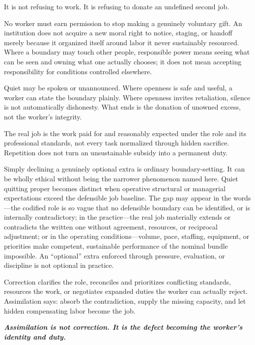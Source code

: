 \documentclass[11pt,oneside]{article}
\renewenvironment{quote}
  {\begin{tcolorbox}[
      enhanced,
      breakable,
      colback=ManifestLight,
      colframe=ManifestRule,
      boxrule=0pt,
      leftrule=3pt,
      arc=0pt,
      outer arc=0pt,
      left=10pt,right=10pt,top=8pt,bottom=8pt,
      before skip=0.8em,after skip=0.8em
    ]\itshape}
  {\end{tcolorbox}}
\begin{document}
It is not refusing to work. It is refusing to donate an undefined second
job.

No worker must earn permission to stop making a genuinely voluntary
gift. An institution does not acquire a new moral right to notice,
staging, or handoff merely because it organized itself around labor it
never sustainably resourced. Where a boundary may touch other people,
responsible power means seeing what can be seen and owning what one
actually chooses; it does not mean accepting responsibility for
conditions controlled elsewhere.

Quiet may be spoken or unannounced. Where openness is safe and useful, a
worker can state the boundary plainly. Where openness invites
retaliation, silence is not automatically dishonesty. What ends is the
donation of unowned excess, not the worker's integrity.

The real job is the work paid for and reasonably expected under the role
and its professional standards, not every task normalized through hidden
sacrifice. Repetition does not turn an unsustainable subsidy into a
permanent duty.

Simply declining a genuinely optional extra is ordinary
boundary-setting. It can be wholly ethical without being the narrower
phenomenon named here. Quiet quitting proper becomes distinct when
operative structural or managerial expectations exceed the defensible
job baseline. The gap may appear in the words---the codified role is so
vague that no defensible boundary can be identified, or is internally
contradictory; in the practice---the real job materially extends or
contradicts the written one without agreement, resources, or reciprocal
adjustment; or in the operating conditions---volume, pace, staffing,
equipment, or priorities make competent, sustainable performance of the
nominal bundle impossible. An ``optional'' extra enforced through
pressure, evaluation, or discipline is not optional in practice.

Correction clarifies the role, reconciles and prioritizes conflicting
standards, resources the work, or negotiates expanded duties the worker
can actually reject. Assimilation says: absorb the contradiction, supply
the missing capacity, and let hidden compensating labor become the job.

\begin{quote}
\textbf{Assimilation is not correction. It is the defect becoming the
worker's identity and duty.}
\end{quote}
\end{document}

